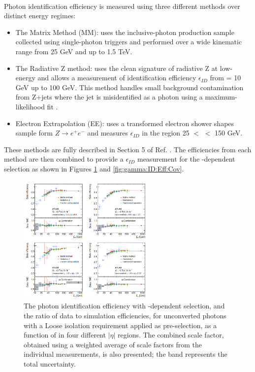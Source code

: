 \\
Photon identification efficiency is measured using three different methods over distinct energy regimes:
\begin{itemize}
\item The Matrix Method (MM): uses the inclusive-photon production sample collected using single-photon triggers and performed over a wide kinematic range from 25 GeV and up to 1.5 TeV. 
\item The Radiative Z method: uses the clean signature of radiative Z at low-energy and allows a measurement of identification efficiency $\epsilon_{ID}$ from \eT = 10 GeV up to 100 GeV. This method handles small background contamination from Z+jets where the jet is misidentified as a photon using a maximum-likelihood fit \cite{Photon_Eff_Run1}. 
\item Electron Extrapolation (EE): uses a transformed electron shower shapes sample form $Z\rightarrow e^+e^-$ and measures $\epsilon_{ID}$ in the region 25 $<$ \eT $<$ 150 GeV.
\end{itemize}
These methods are fully described in Section 5 of Ref. \cite{Photon_Eff_2015}. The efficiencies from each method are then combined to provide a $\epsilon_{ID}$ measurement for the \eT-dependent selection as shown in Figures \ref{fig:gamma:ID:Eff:UnCov} and \ref{fig:gamma:ID:Eff:Cov}. 
\begin{figure}[htbp]
    \centering
    \includegraphics[width=0.6\textwidth]{Ch3/Img/Unconverted_Eff_2017.png}
    \caption{The photon identification efficiency with \eT-dependent selection, and the ratio of data to simulation efficiencies, for unconverted photons with a Loose isolation requirement applied as pre-selection, as a function of \eT in four different $|\eta|$ regions. The combined scale factor, obtained using a weighted average of scale factors from the individual measurements, is also presented; the band represents the total uncertainty.}
    \label{fig:gamma:ID:Eff:UnCov}
\end{figure}
